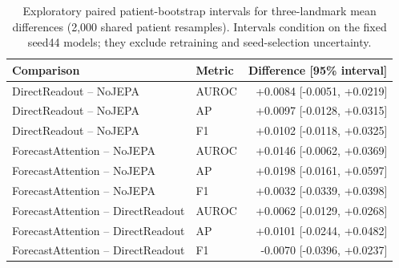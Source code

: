 \begin{table}[t]
\centering
\caption{Exploratory paired patient-bootstrap intervals for three-landmark mean differences (2,000 shared patient resamples). Intervals condition on the fixed seed44 models; they exclude retraining and seed-selection uncertainty.}
\label{tab:bootstrap}
\small
\begin{tabular}{llr}
\toprule
Comparison & Metric & Difference [95\% interval] \\
\midrule
DirectReadout -- NoJEPA & AUROC & +0.0084 [-0.0051, +0.0219] \\
DirectReadout -- NoJEPA & AP & +0.0097 [-0.0128, +0.0315] \\
DirectReadout -- NoJEPA & F1 & +0.0102 [-0.0118, +0.0325] \\
ForecastAttention -- NoJEPA & AUROC & +0.0146 [-0.0062, +0.0369] \\
ForecastAttention -- NoJEPA & AP & +0.0198 [-0.0161, +0.0597] \\
ForecastAttention -- NoJEPA & F1 & +0.0032 [-0.0339, +0.0398] \\
ForecastAttention -- DirectReadout & AUROC & +0.0062 [-0.0129, +0.0268] \\
ForecastAttention -- DirectReadout & AP & +0.0101 [-0.0244, +0.0482] \\
ForecastAttention -- DirectReadout & F1 & -0.0070 [-0.0396, +0.0237] \\
\bottomrule
\end{tabular}
\end{table}

